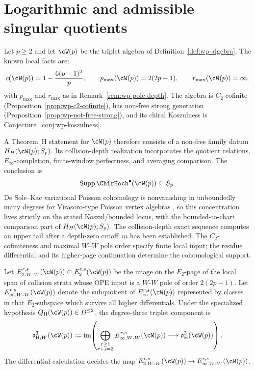 \section{Logarithmic and admissible singular quotients}
\label{sec:theorem-h-logarithmic-wp}

\begin{theorem}
\label{thm:theorem-h-logarithmic-w(p)}
Let $p\geq2$ and let $\cW(p)$ be the triplet algebra of
Definition~\ref{def:wp-algebra}. The known local facts are:
\[
 c(\cW(p))=1-\frac{6(p-1)^2}{p},\qquad
 p_{\max}(\cW(p))=2(2p-1),\qquad
 r_{\max}(\cW(p))=\infty,
\]
with $p_{\max}$ and $r_{\max}$ as in
Remark~\ref{rem:wp-pole-depth}. The algebra is $C_2$-cofinite
\textup{(}Proposition~\ref{prop:wp-c2-cofinite}\textup{)}, has
non-free strong generation
\textup{(}Proposition~\ref{prop:wp-not-free-strong}\textup{)}, and
its chiral Koszulness is Conjecture~\ref{conj:wp-koszulness}.

A Theorem~H statement for $\cW(p)$ therefore consists of a non-free
family datum $H_H(\cW(p);S_p)$.  Its collision-depth realization
incorporates the quotient relations, $E_\infty$-completion,
finite-window perfectness, and averaging comparison.  The conclusion
is
\[
 \operatorname{Supp}\ChirHoch^\bullet(\cW(p))\subseteq S_p.
\]
De Sole--Kac variational Poisson cohomology is nonvanishing in
unboundedly many degrees for Virasoro-type Poisson vertex algebras
\cite{BDSK21}, so this concentration lives strictly on the stated
Koszul/bounded locus, with the bounded-to-chart comparison part of
$H_H(\cW(p);S_p)$.
The collision-depth exact sequence computes an upper tail after a
depth-zero cutoff~$m$ has been established.  The $C_2$-cofiniteness
and maximal $W$--$W$ pole order specify finite local input; the
residue differential and its higher-page continuation determine the
cohomological support.

Let
$E_{2,W\text{-}W}^{r,s}(\cW(p))\subset E_2^{r,s}(\cW(p))$ be the
image on the $E_2$-page of the local span of collision strata whose
OPE input is a $W$-$W$ pole of order $2(2p-1)$. Let
$E_{\infty,W\text{-}W}^{r,s}(\cW(p))$ denote the subquotient of
$E_\infty^{r,s}(\cW(p))$ represented by classes in that $E_2$-subspace
which survive all higher differentials. Under the specialized
hypothesis $Q_{\mathrm H}(\cW(p))\in D^{\leq2}$, the degree-three
triplet component is
\[
 \mathfrak{o}_{\mathrm H,W}^{3}(\cW(p))
 :=
 \operatorname{im}\!\left(
  \bigoplus_{\substack{r\geq1\\ r+s=3}}
  E_{\infty,W\text{-}W}^{r,s}(\cW(p))
  \longrightarrow
  \mathfrak{o}_{\mathrm H}^{3}(\cW(p))
 \right).
\]
The differential calculation decides the map
$E_{2,W\text{-}W}^{r,s}(\cW(p))\to
E_{\infty,W\text{-}W}^{r,s}(\cW(p))$.
\end{theorem}

